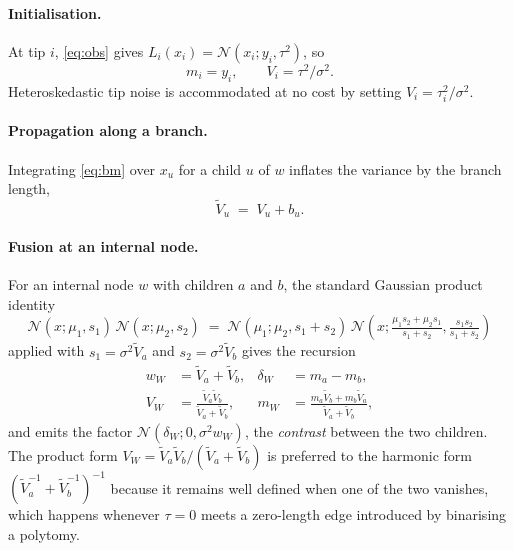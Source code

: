 \documentclass[11pt]{article}
\theoremstyle{remark}
\newcommand{\Norm}{\mathcal{N}}
\begin{document}
\paragraph{Initialisation.} At tip $i$, \eqref{eq:obs} gives $L_i(x_i) = \Norm(x_i; y_i, \tau^2)$, so
\begin{equation}
  m_i = y_i, \qquad V_i = \tau^2/\sigma^2 .
  \label{eq:init}
\end{equation}
Heteroskedastic tip noise is accommodated at no cost by setting $V_i = \tau_i^2/\sigma^2$.

\paragraph{Propagation along a branch.} Integrating \eqref{eq:bm} over $x_u$ for a child $u$ of $w$
inflates the variance by the branch length,
\begin{equation}
  \tilde{V}_u \;=\; V_u + b_u .
  \label{eq:prop}
\end{equation}

\paragraph{Fusion at an internal node.} For an internal node $w$ with children $a$ and $b$, the
standard Gaussian product identity
\begin{equation}
  \Norm(x; \mu_1, s_1)\,\Norm(x; \mu_2, s_2)
  \;=\;
  \Norm\!\left(\mu_1; \mu_2, s_1 + s_2\right)\,
  \Norm\!\left(x; \tfrac{\mu_1 s_2 + \mu_2 s_1}{s_1+s_2}, \tfrac{s_1 s_2}{s_1+s_2}\right)
  \label{eq:gaussprod}
\end{equation}
applied with $s_1 = \sigma^2\tilde{V}_a$ and $s_2 = \sigma^2\tilde{V}_b$ gives the recursion
\begin{align}
  w_{\!\scriptscriptstyle W} &= \tilde{V}_a + \tilde{V}_b, &
  \delta_{\!\scriptscriptstyle W} &= m_a - m_b, \label{eq:contrast}\\
  V_{\!\scriptscriptstyle W} &= \frac{\tilde{V}_a \tilde{V}_b}{\tilde{V}_a + \tilde{V}_b}, &
  m_{\!\scriptscriptstyle W} &= \frac{m_a \tilde{V}_b + m_b \tilde{V}_a}{\tilde{V}_a + \tilde{V}_b},
  \label{eq:fuse}
\end{align}
and emits the factor $\Norm(\delta_{\!\scriptscriptstyle W}; 0, \sigma^2 w_{\!\scriptscriptstyle W})$,
the \emph{contrast} between the two children. The product form
$V_{\!\scriptscriptstyle W} = \tilde V_a \tilde V_b / (\tilde V_a + \tilde V_b)$ is preferred to the
harmonic form $(\tilde V_a^{-1} + \tilde V_b^{-1})^{-1}$ because it remains well defined when one of
the two vanishes, which happens whenever $\tau = 0$ meets a zero-length edge introduced by
binarising a polytomy.
\end{document}
